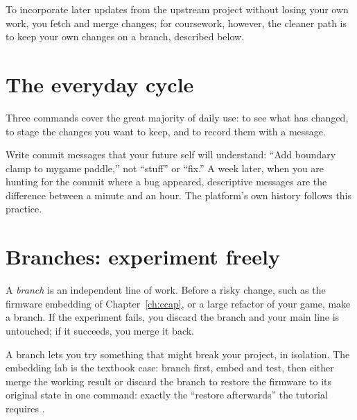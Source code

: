 To incorporate later updates from the upstream project without losing your own
work, you fetch and merge changes; for coursework, however, the cleaner path is to
keep your own changes on a branch, described below.

\section{The everyday cycle}

Three commands cover the great majority of daily use:  to see what has
changed,  to stage the changes you want to keep, and  to
record them with a message.



\begin{prgwarn}
Write commit messages that your future self will understand: ``Add boundary clamp
to mygame paddle,'' not ``stuff'' or ``fix.'' A week later, when you are hunting for
the commit where a bug appeared, descriptive messages are the difference between a
minute and an hour. The platform's own history follows this practice.
\end{prgwarn}

\section{Branches: experiment freely}

A \emph{branch} is an independent line of work. Before a risky change, such as the
firmware embedding of Chapter~\ref{ch:ccap}, or a large refactor of your game, make
a branch. If the experiment fails, you discard the branch and your main line is
untouched; if it succeeds, you merge it back.



\begin{prgconcept}
A branch lets you try something that might break your project, in isolation. The
embedding lab is the textbook case: branch first, embed and test, then either merge
the working result or discard the branch to restore the firmware to its original
state in one command: exactly the ``restore afterwards'' the tutorial requires
\citep{prg32tutorialc}.
\end{prgconcept}


